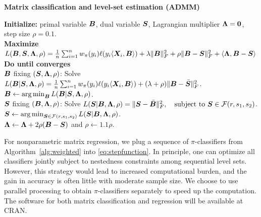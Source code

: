 \documentclass[11pt]{article}
\theoremstyle{definition}
\begin{document}
 \begin{algorithm}[h]
  \caption{{\bf Matrix classification and level-set estimation (ADMM)} } \label{alg:weighted}
{\bf Initialize:} primal variable $\bm B$, dual variable $\bm S$, Lagrangian multiplier $\bm{\Lambda}=\mathbf{0}$, step size $\rho=0.1$.\\
{\bf Maximize} $
L(\bm B,\bm S,\bm{\Lambda},\rho)={1\over n}\sum_{i=1}^nw_\pi(y_i)\ell(y_i\langle \bm X_i,\bm B \rangle) + \lambda\lVert\bm B\rVert_F^2+\rho\lVert\bm B-\bm S\rVert_F^2+\langle \bm{\Lambda}, \bm B-\bm S\rangle$\\
{\bf Do until converges}\\[.1cm]
\hspace*{.2cm}{\bf Update} $\bm B$ fixing $(\bm S,\bm{\Lambda},\rho)$: Solve $L(\bm B|\bm S,\bm{\Lambda},\rho)={1\over n}\sum_{i=1}^n w_\pi(y_i)\ell(y_i\langle\bm X_i,\bm B\rangle)+(\lambda+\rho)\lVert\bm B-\bar {\bm S}\rVert_F^2$.\\
\hspace{.2cm} $\bm B \leftarrow \operatorname*{arg\,min}_{\bm B} L(\bm B|\bm S,\bm{\Lambda},\rho)$.\\[.2cm]
\hspace*{.2cm}{\bf Update} $\bm S$ fixing $(\bm B,\bm{\Lambda},\rho)$: Solve  $ L(\bm S|\bm B,\bm{\Lambda},\rho)=\lVert\bm S-\bar {\bm B}\rVert_F^2,\quad \text{subject to }\bm S\in\mathcal{F}(r,s_1,s_2)$.\\
\hspace{.2cm} $\bm S \leftarrow  \operatorname*{arg\,min}_{\bm S\in \mathcal{F}(r,s_1,s_2)}L(\bm S|\bm B,\bm{\Lambda},\rho)$.\\[.1cm]
\hspace*{.2cm}{\bf Update} $\bm{\Lambda} \leftarrow \bm{\Lambda}+2\rho(\bm B-\bm S)$ and  $\rho\leftarrow1.1\rho$.\\[.2cm]
\end{algorithm}

For nonparametric matrix regression, we plug a sequence of $\pi$-classifiers from Algorithm~\ref{alg:weighted} into \eqref{eq:stepfunction}. In principle, one can optimize all classifiers jointly subject to nestedness constraints among sequential level sets. However, this strategy would lead to increased computational burden, and the gain in accuracy is often little with moderate sample size. We choose to use parallel processing to obtain $\pi$-classifiers separately to speed up the computation. The software for both matrix classification and regression will be available at CRAN.
\end{document}
